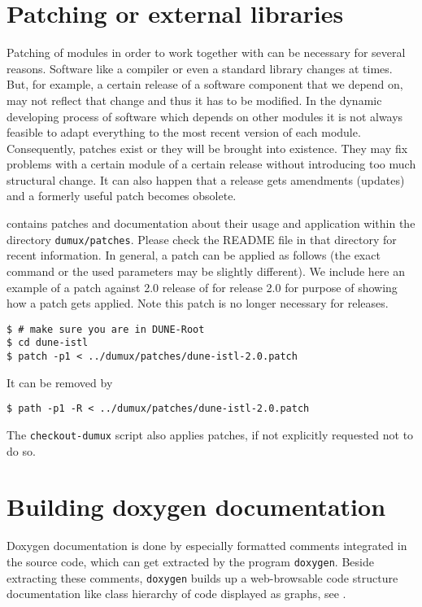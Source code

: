 \section{Patching \Dune or external libraries}
Patching of \Dune modules in order to work together with \Dumux can be necessary for several reasons.
Software like a compiler or even a standard library
changes at times. But, for example, a certain release of a software component that we depend on, may not reflect that change and thus it has to be modified.
In the dynamic developing process of software which depends on other modules it is not always feasible 
to adapt everything to the most recent version of each module. Consequently, patches exist or they will be brought into existence. They may fix problems with a certain module
of a certain release without introducing too much structural change. It can also happen 
that a release gets amendments (updates) and a formerly useful patch becomes obsolete.

\Dumux contains patches and documentation about their usage and application within the directory \texttt{dumux/patches}.
Please check the README file in that directory for recent information. 
In general, a patch can be applied as follows (the exact command or the used parameters may be slightly different).
We include here an example of a patch against 2.0 release of \Dune for \Dumux release 2.0 for purpose of showing how a patch gets applied. Note this patch is no longer necessary for  releases.

\begin{lstlisting}[style=Bash]
$ # make sure you are in DUNE-Root
$ cd dune-istl
$ patch -p1 < ../dumux/patches/dune-istl-2.0.patch
\end{lstlisting}

It can be removed by 
\begin{lstlisting}[style=Bash]
$ path -p1 -R < ../dumux/patches/dune-istl-2.0.patch
\end{lstlisting}

The \texttt{checkout-dumux} script also applies patches, if not explicitly requested not to do so.


\section{Building doxygen documentation} \label{sec:build-doxy-doc}

Doxygen documentation is done by especially formatted comments integrated in the source code, which can get extracted by the program 
\texttt{doxygen}. Beside extracting these comments, \texttt{doxygen} builds up a web-browsable code structure documentation
like class hierarchy of code displayed as graphs, see \cite{DOXYGEN-HP}.

